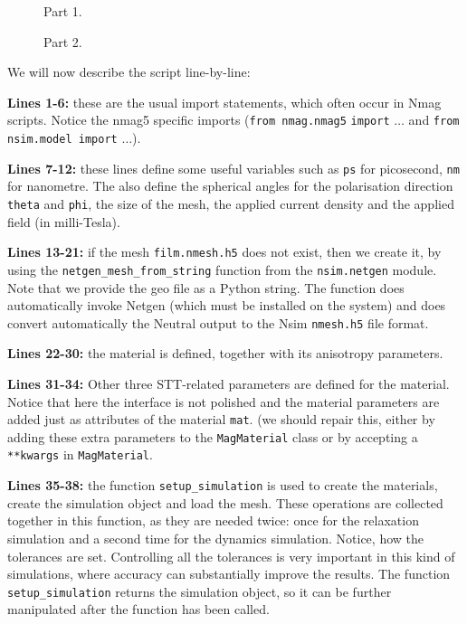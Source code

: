 \documentclass[11pt,oneside,openany]{article}
\begin{document}
\begin{figure}[!p]

\caption{Part 1.}
\label{fig:script1of2}
\end{figure}

\begin{figure}[!h]

\caption{Part 2.}
\label{fig:script2of2}
\end{figure}

We will now describe the script line-by-line:

\textbf{Lines 1-6:} these are the usual import statements, which often occur
in Nmag scripts. Notice the nmag5 specific imports (\verb|from nmag.nmag5|
\verb|import| $\ldots$ and \verb|from| \verb|nsim.model import| $\ldots$).

\textbf{Lines 7-12:} these lines define some useful variables such as
\verb|ps| for picosecond, \verb|nm| for nanometre.  The also define the
spherical angles for the polarisation direction \verb|theta| and \verb|phi|,
the size of the mesh, the applied current density and the applied field
(in milli-Tesla).

\textbf{Lines 13-21:} if the mesh \verb|film.nmesh.h5| does not exist, then
we create it, by using the \verb|netgen_mesh_from_string| function from the
\verb|nsim.netgen| module. Note that we provide the geo file as a Python
string. The function does automatically invoke Netgen (which must be installed
on the system) and does convert automatically the Neutral output to the
Nsim \verb|nmesh.h5| file format.

\textbf{Lines 22-30:} the material is defined, together with its anisotropy
parameters.

\textbf{Lines 31-34:} Other three STT-related parameters are defined for the
material. Notice that here the interface is not polished and the material
parameters are added just as attributes of the material \verb|mat|. (we should
repair this, either by adding these extra parameters to the \verb|MagMaterial|
class or by accepting a \verb|**kwargs| in \verb|MagMaterial|.

\textbf{Lines 35-38:} the function \verb|setup_simulation| is used to create
the materials, create the simulation object and load the mesh. These operations
are collected together in this function, as they are needed twice: once for the
relaxation simulation and a second time for the dynamics simulation.  Notice,
how the tolerances are set. Controlling all the tolerances is very important in
this kind of simulations, where accuracy can substantially improve the
results. The function \verb|setup_simulation| returns the simulation object, so
it can be further manipulated after the function has been called.
\end{document}
